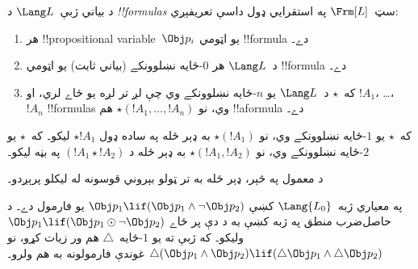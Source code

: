 \documentclass[../../../include/open-logic-section]{subfiles}
\begin{document}


\begin{defn}[فارمول]
د بياني ژبې~$\Lang L$ د \emph{!!{formula}s} سټ~$\Frm[L]$
په استقرايي ډول داسې تعريفېږي:
\begin{enumerate}
\item هر !!{propositional variable}~$\Obj p_i$ يو اټومي
  !!{formula} دے۔
\item د~$\Lang L$ هر $0$-ځايه نښلوونکے (بياني ثابت)
  يو اټومي !!{formula} دے۔
\item که~$\star$ د~$\Lang L$ يو $n$-ځايه نښلوونکے وي چې لږ تر لږه يو ځاے لري، او
  $!A_1$، \dots، $!A_n$ !!{formula}s وي، نو
  $\star(!A_1, \dots, !A_n)$ هم !!a{formula} دے۔
\end{enumerate}
که~$\star$ يو $1$-ځايه نښلوونکے وي، نو
$\star(!A_1)$ به ډېر ځله په ساده ډول $\star !A_1$ ليکو۔
که~$\star$ يو $2$-ځايه نښلوونکے وي، نو
$\star(!A_1,!A_2)$ به ډېر ځله د $(!A_1 \star !A_2)$
په بڼه ليکو۔
\end{defn}

د معمول په څېر، ډېر ځله به تر ټولو بېروني قوسونه له ليکلو پرېږدو۔

\begin{ex}
  په معياري ژبه~$\Lang{L_0}$ کښې
  $\Obj p_1 \lif (\Obj p_1 \land \lnot \Obj p_2)$ يو فارمول دے۔
  د حاصل‌ضرب منطق په ژبه کښې به د دې پر ځاے
  $\Obj p_1 \lif (\Obj p_1 \odot \lnot \Obj p_2)$ وليکو۔
  که ژبې ته يو $1$-ځايه~$\triangle$ هم ور زيات کړو، نو
  $\triangle (\Obj p_1 \land \Obj p_2) \lif (\triangle \Obj p_1 \land \triangle \Obj p_2)$
  غوندې فارمولونه به هم ولرو۔
\end{ex}
\end{document}
